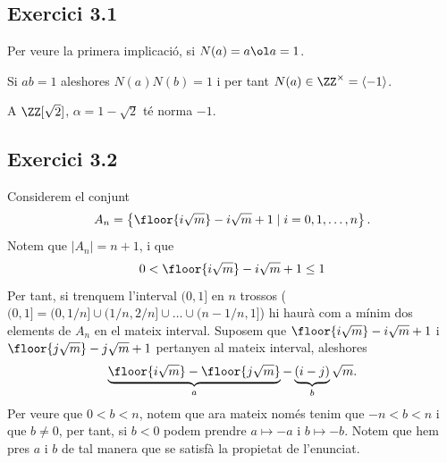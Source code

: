 \documentclass[11pt, a4paper]{article}
\begin{document}
    \subsection{Exercici 3.1}
    Per veure la primera implicació, si $N(a)=a\ol a=1$.\par
    Si $ab=1$ aleshores $N(a)N(b)=1$ i per tant $N(a)\in\ZZ^\times=\langle-1\rangle$.\par
    A $\ZZ[\sqrt{2}]$, $\alpha=1-\sqrt{2}$ té norma $-1$.
    \subsection{Exercici 3.2}
    Considerem el conjunt 
    \[A_n=\left\{\floor{i\sqrt{m}}-i\sqrt{m}+1\mid i=0,1,\dots,n\right\}.\]
    Notem que $|A_n|=n+1$, i que
    \[
        0<\floor{i\sqrt{m}}-i\sqrt{m}+1\leq1
    \]
    Per tant, si trenquem l'interval $(0,1]$ en $n$ trossos ($(0,1]=(0,1/n]\cup(1/n,2/n]\cup\dots\cup(n-1/n,1]$) hi haurà com a mínim dos elements de $A_n$ en el mateix interval. Suposem que $\floor{i\sqrt{m}}-i\sqrt{m}+1$ i $\floor{j\sqrt{m}}-j\sqrt{m}+1$ pertanyen al mateix interval, aleshores
    \[
        \underbrace{\floor{i\sqrt{m}}-\floor{j\sqrt{m}}}_{a}
        -\underbrace{(i-j)}_b\sqrt{m}.
    \]
    Per veure que $0<b<n$, notem que ara mateix només tenim que $-n<b<n$ i que $b\neq0$, per tant, si $b<0$ podem prendre $a\mapsto -a$ i $b\mapsto-b$. Notem que hem pres $a$ i $b$ de tal manera que se satisfà la propietat de l'enunciat.
\end{document}
